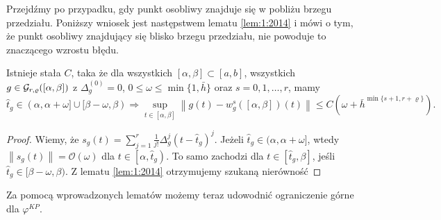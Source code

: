 \documentclass[oik, pdftex, man]{mgrwms}
\begin{document}
    Przejdźmy po przypadku, gdy punkt osobliwy znajduje się w pobliżu brzegu przedziału. Poniższy wniosek jest następstwem lematu \ref{lem:1:2014} i mówi o tym, że punkt osobliwy znajdujący się blisko brzegu przedziału, nie powoduje to znaczącego wzrostu błędu.

    \begin{cor} \label{cor:1}
        Istnieje stała $C$, taka że dla wszystkich $[\alpha, \beta] \subset [a, b]$, wszystkich $g \in \mathcal{G}_{r,\varrho}([\alpha,\beta])$ z $\Delta_{g}^{(0)} = 0$, $0 \leq \omega \leq \min \{1, \bar{h}\}$ oraz $s=0,1,\dots,r$, mamy
        \begin{equation*}
            \hat{t}_{g} \in(\alpha, \alpha+\omega] \cup[\beta-\omega, \beta) \Longrightarrow  \sup_{t \in[\alpha, \beta]}\left\|g(t)-w_{g}^{s}([\alpha, \beta])(t)\right\| \leq C\left(\omega+\bar{h}^{\min \{s+1, r+\varrho\}}\right).
        \end{equation*}
    \end{cor}
    \begin{proof}
        Wiemy, że $s_{g}(t)=\sum_{j=1}^{r} \frac{1}{j !} \Delta_{g}^{j}\left(t-\hat{t}_{g}\right)^{j}$. Jeżeli $\hat{t}_{g} \in(\alpha, \alpha+\omega]$, wtedy $\left\|s_{g}(t)\right\|=\mathcal{O}(\omega)$ dla $t \in\left[\alpha, \hat{t}_{g}\right) .$ To samo zachodzi dla $t \in\left[\hat{t}_{g}, \beta\right]$, jeśli $\hat{t}_{g} \in[\beta-\omega, \beta)$. Z lematu \ref{lem:1:2014} otrzymujemy szukaną nierówność
    \end{proof}

    Za pomocą wprowadzonych lematów możemy teraz udowodnić ograniczenie górne dla $\varphi^{KP}$.
\end{document}
